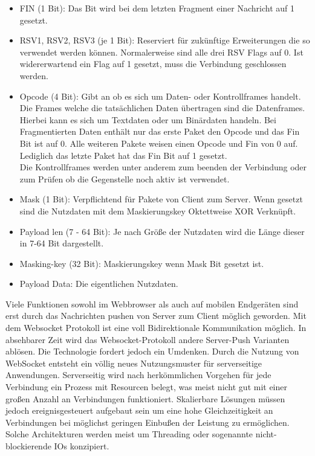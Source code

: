 \begin{itemize}  
\item FIN (1 Bit): Das Bit wird bei dem letzten Fragment einer Nachricht auf 1 gesetzt.
\item RSV1, RSV2, RSV3 (je 1 Bit): Reserviert für zukünftige Erweiterungen die so verwendet werden können. Normalerweise sind alle drei RSV Flags auf 0. Ist widererwartend ein Flag auf 1 gesetzt, muss die Verbindung geschlossen werden.
\item Opcode (4 Bit): Gibt an ob es sich um Daten- oder Kontrollframes handelt. Die Frames welche die tatsächlichen Daten übertragen sind die Datenframes. Hierbei kann es sich um Textdaten oder um Binärdaten handeln. Bei Fragmentierten Daten enthält nur das erste Paket den Opcode und das Fin Bit ist auf 0. Alle weiteren Pakete weisen einen Opcode und Fin von 0 auf. Lediglich das letzte Paket hat das Fin Bit auf 1 gesetzt.\\
Die Kontrollframes werden unter anderem zum beenden der Verbindung oder zum Prüfen ob die Gegenstelle noch aktiv ist verwendet.
\item Mask (1 Bit): Verpflichtend für Pakete von Client zum Server. Wenn gesetzt sind die Nutzdaten mit dem Maskierungskey Oktettweise XOR Verknüpft.
\item Payload len (7 - 64 Bit): Je nach Größe der Nutzdaten wird die Länge dieser in 7-64 Bit dargestellt.
\item Masking-key (32 Bit): Maskierungskey wenn Mask Bit gesetzt ist.
\item Payload Data: Die eigentlichen Nutzdaten.
\end{itemize}
Viele Funktionen sowohl im Webbrowser als auch auf mobilen Endgeräten sind erst durch das Nachrichten pushen von Server zum Client möglich geworden. Mit dem Websocket Protokoll ist eine voll Bidirektionale Kommunikation möglich. In absehbarer Zeit wird das Websocket-Protokoll andere Server-Push Varianten ablösen. Die Technologie fordert jedoch ein Umdenken. Durch die Nutzung von WebSocket entsteht ein völlig neues Nutzungsmuster für serverseitige Anwendungen. Serverseitig wird nach herkömmlichen Vorgehen für jede Verbindung ein Prozess mit Resourcen belegt, was meist nicht gut mit einer großen Anzahl an Verbindungen funktioniert.
Skalierbare Lösungen müssen jedoch ereignisgesteuert aufgebaut sein um eine hohe Gleichzeitigkeit an Verbindungen bei möglichst geringen Einbußen der Leistung zu ermöglichen. Solche Architekturen werden meist um Threading oder sogenannte nicht-blockierende IOs konzipiert.


